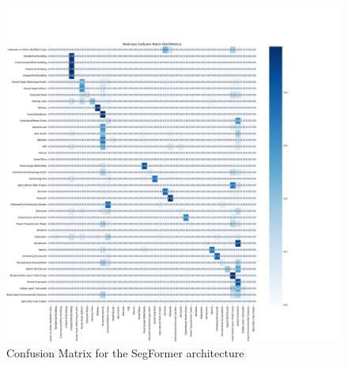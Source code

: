 \documentclass{report}
\begin{document}
\newpage
\begin{figure}[H]
    \vspace*{-4cm} %
    \hspace*{-4cm} %
    \includegraphics[width=2.03\textwidth]{own_images/confusion_matrix_SegFormer_mit_b3_20250626_204750.png}
    \caption{Confusion Matrix for the SegFormer architecture}
    \label{fig:con_mat_segformer}
\end{figure}
\end{document}
